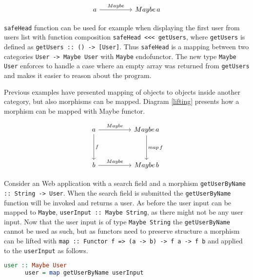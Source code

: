 \documentclass[article]{aaltoseries}
\begin{document}
    \begin{equation}
      \label{mapping}
      \begin{tikzcd}[row sep=huge, column sep=huge]
        a \arrow[r, "Maybe"]
        & Maybe\, a
      \end{tikzcd}
    \end{equation}

    \lstinline|safeHead| function can be used for example when displaying the
    first user from users list with function composition
    \lstinline|safeHead <<< getUsers|, where \lstinline|getUsers| is defined as
    \lstinline|getUsers :: () -> [User]|. Thus \lstinline|safeHead| is a mapping
    between two categories \lstinline|User -> Maybe User| with \lstinline|Maybe|
    endofunctor. The new type \lstinline|Maybe User| enforces to handle a case
    where an empty array was returned from \lstinline|getUsers| and makes it
    easier to reason about the program.

    Previous examples have presented mapping of objects to objects inside
    another category, but also morphisms can be mapped. Diagram \ref{lifting}
    presents how a morphism can be mapped with Maybe functor.

    \begin{equation}
      \label{lifting}
      \begin{tikzcd}[row sep=huge, column sep=huge]
        a \arrow[r, "Maybe"]
        \arrow[d, "f"]
        & Maybe\, a
        \arrow[d, "map\, f"]
        \\
        b \arrow[r, "Maybe"]
        & Maybe\, b
      \end{tikzcd}
    \end{equation}

    Consider an Web application with a search field and a morphism
    \lstinline|getUserByName :: String -> User|. When the search field is
    submitted the \lstinline|getUserByName| function will be invoked and returns
    a user. As before the user input can be mapped to \lstinline|Maybe|,
    \lstinline|userInput :: Maybe String|, as there might not be any user input.
    Now that the user input is of type \lstinline|Maybe String| the
    \lstinline|getUserByName| cannot be used as such, but as functors need to
    preserve structure a morphism can be lifted with
    \lstinline|map :: Functor f => (a -> b) -> f a -> f b| and applied to the
    \lstinline|userInput| as follows. 

    \begin{lstlisting}[language=Haskell]
      user :: Maybe User
      user = map getUserByName userInput
    \end{lstlisting}
\end{document}
